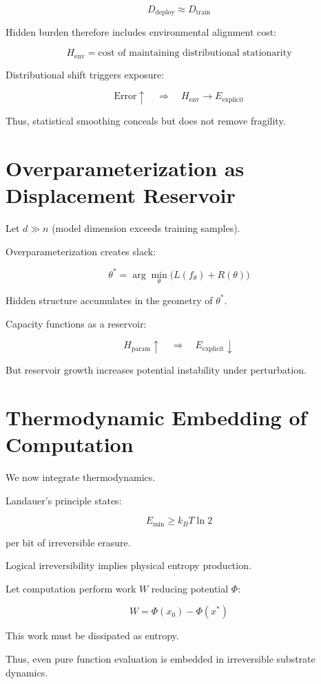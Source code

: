 \documentclass[11pt,openany]{book}
\begin{document}
\[
D_{\text{deploy}} \approx D_{\text{train}}
\]

Hidden burden therefore includes environmental alignment cost:

\[
H_{\text{env}} = \text{cost of maintaining distributional stationarity}
\]

Distributional shift triggers exposure:

\[
\text{Error} \uparrow \quad \Rightarrow \quad H_{\text{env}} \to E_{\text{explicit}}
\]

Thus, statistical smoothing conceals but does not remove fragility.

\section{Overparameterization as Displacement Reservoir}

Let $d \gg n$ (model dimension exceeds training samples).

Overparameterization creates slack:

\[
\theta^* = \arg\min_{\theta} \big(L(f_\theta) + R(\theta)\big)
\]

Hidden structure accumulates in the geometry of $\theta^*$.

Capacity functions as a reservoir:

\[
H_{\text{param}} \uparrow \quad \Rightarrow \quad E_{\text{explicit}} \downarrow
\]

But reservoir growth increases potential instability under perturbation.

\section{Thermodynamic Embedding of Computation}

We now integrate thermodynamics.

Landauer's principle states:

\[
E_{\text{min}} \geq k_B T \ln 2
\]

per bit of irreversible erasure.

Logical irreversibility implies physical entropy production.

Let computation perform work $W$ reducing potential $\Phi$:

\[
W = \Phi(x_0) - \Phi(x^*)
\]

This work must be dissipated as entropy.

Thus, even pure function evaluation is embedded in irreversible substrate dynamics.
\end{document}
